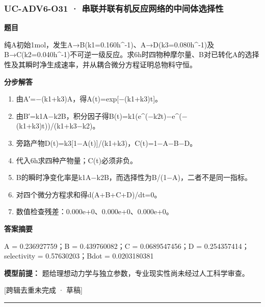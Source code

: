 \documentclass[UTF8,11pt,a4paper]{ctexart}
\begin{document}
\subsubsection*{UC-ADV6-O31 · 串联并联有机反应网络的中间体选择性}
\noindent\textbf{题目}\par
纯A初始1mol，发生A→B(k1=0.160h\textasciicircum{}-1)、A→D(k3=0.080h\textasciicircum{}-1)及B→C(k2=0.040h\textasciicircum{}-1)不可逆一级反应。求6h时四物种摩尔量、B对已转化A的选择性及其瞬时净生成速率，并从耦合微分方程证明总物料守恒。\par
\medskip\noindent\textbf{分步解答}
\begin{enumerate}
\item 由A′=−(k1+k3)A，得A(t)=exp[−(k1+k3)t]。
\item 由B′=k1A−k2B，积分因子得B(t)=k1(e\textasciicircum{}(−k2t)−e\textasciicircum{}(−(k1+k3)t))/(k1+k3−k2)。
\item 旁路产物D(t)=k3[1−A(t)]/(k1+k3)，C(t)=1−A−B−D。
\item 代入6h求四种产物量；C(t)必须非负。
\item B的瞬时净变化率是k1A−k2B，而选择性为B/(1−A)，二者不是同一指标。
\item 对四个微分方程求和得d(A+B+C+D)/dt=0。
\item 数值检查残差：0.000e+0、0.000e+0、0.000e+0。
\end{enumerate}
\noindent\textbf{答案摘要}\par
A = 0.236927759；B = 0.439760082；C = 0.0689547456；D = 0.254357414；selectivity = 0.57630203；Bdot = 0.0203180381\par
\noindent\textbf{模型前提：}
题给理想动力学与独立参数，专业现实性尚未经过人工科学审查。\par
\noindent\textcolor{red!65!black}{[跨辑去重未完成 · 草稿]} \par
\medskip\hrule\medskip
{}
\end{document}
